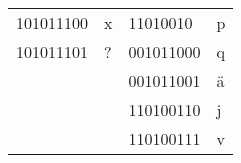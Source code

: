 \documentclass[12pt, authoryear]{elsarticle}
\begin{document}
\begin{table}[]
\begin{tabular}{|l|l|l|l|}
		101011100                     & x                             & 11010010                        & p                          \\
		101011101                     & ?                             & 001011000                         & q                          \\
		\cellcolor[HTML]{EFEFEF}      & \cellcolor[HTML]{EFEFEF}      & 001011001                         & \"{a}                         \\
		\cellcolor[HTML]{EFEFEF}      & \cellcolor[HTML]{EFEFEF}      & 110100110                       & j                          \\
		\cellcolor[HTML]{EFEFEF}      & \cellcolor[HTML]{EFEFEF}      & 110100111                       & v                          \\ \hline
	\end{tabular}
\end{table}


\pagebreak



\appendix
\setcounter{figure}{0}
\end{document}
